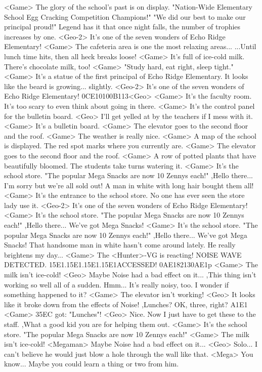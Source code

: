 <Game> The glory of the school's past is on display. 
"Nation-Wide Elementary School Egg Cracking Competition Champions!" 
"We did our best to make our principal proud!" 
Legend has it that once night falls, the number of trophies increases by one. 
<Geo-2> It's one of the seven wonders of Echo Ridge Elementary! 
<Game> The cafeteria area is one the most relaxing areas... 
...Until lunch time hits, then all heck breaks loose! 
<Game> It's full of ice-cold milk. 
There's chocolate milk, too! 
<Game> "Study hard,  eat right,  sleep tight." 
<Game> It's a statue of the first principal of Echo Ridge Elementary. 
It looks like the beard is growing... slightly. 
<Geo-2> It's one of the seven wonders of Echo Ridge Elementary! 
{0C}{E1}{01}{00}{B1}{13}<Geo>
<Game> It's the faculty room. 
It's too scary to even think about going in there. 
<Game> It's the control panel for the bulletin board. 
<Geo> I'll get yelled at by the teachers if I mess with it. 
<Game> It's a bulletin board. 
<Game> The elevator goes to the second floor and the roof. 
<Game> The weather is really nice. 
<Game> A map of the school is displayed. 
The red spot marks where you currently are. 
<Game> The elevator goes to the second floor and the roof. 
<Game> A row of potted plants that have beautifully bloomed. 
The students take turns watering it. 
<Game> It's the school store. 
"The popular Mega Snacks are now 10 Zennys each!" 
,Hello there... I'm sorry but we're all sold out! 
A man in white with long hair bought them all! 
<Game> It's the entrance to the school store. 
No one has ever seen the store lady use it. 
<Geo-2> It's one of the seven wonders of Echo Ridge Elementary! 
<Game> It's the school store. 
"The popular Mega Snacks are now 10 Zennys each!" 
,Hello there... We've got Mega Snacks! 
<Game> It's the school store. 
"The popular Mega Snacks are now 10 Zennys each!" 
,Hello there... We've got Mega Snacks! 
That handsome man in white hasn't come around lately. 
He really brightens my day... 
<Game> The <Hunter>-VG is reacting! 
NOISE WAVE DETECTED. {15}{E1}.{15}{E1}.{15}{E1}.{15}{E1}ACCESSED! 
{0A}{E1}{82}{13}{0A}{E1}p
<Game> The milk isn't ice-cold! 
<Geo> Maybe Noise had a bad effect on it... 
,This thing isn't working so well all of a sudden. 
Hmm... It's really noisy, too. 
I wonder if something happened to it? 
<Game> The elevator isn't working! 
<Geo> It looks like it broke down from the effects of Noise! 
,Lunches? OK, three, right? 
{A1}{E1} 
<Game> {35}{EC} got: "Lunches"! 
<Geo> Nice. Now I just have to get these to the staff. 
,What a good kid you are for helping them out. 
<Game> It's the school store. 
"The popular Mega Snacks are now 10 Zennys each!" 
<Game> The milk isn't ice-cold! 
<Megaman> Maybe Noise had a bad effect on it... 
<Geo> Solo... I can't believe he would just blow a hole through the wall like that. 
<Mega> You know... Maybe you could learn a thing or two from him. 
